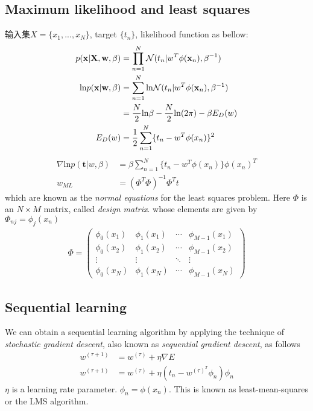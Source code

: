 \documentclass[a4paper]{article}
\begin{document}
\subsection{Maximum likelihood and least squares}
输入集$X = \{x_1,...,x_N\}$, target $\{t_n\}$, likelihood function as bellow:
\begin{align*}
  p(\mathbf{x}|\mathbf{X},\mathbf{w},\beta) &= \prod_{n=1}^N \mathcal{N}(t_n|w^T\phi(\mathbf{x}_n), \beta^{-1})\\
\mathrm{ln} p(\mathbf{x}|\mathbf{w},\beta) &= \sum_{n=1}^N \mathrm{ln} \mathcal{N}(t_n|w^T\phi(\mathbf{x}_n), \beta^{-1}) \\
& = {N \over 2} \mathrm{ln} \beta - {N \over 2} \mathrm{ln} (2\pi) - \beta E_D(w)\\
E_D(w) &= {1 \over 2} \sum_{n=1}^N \{t_n -w^T\phi(x_n)\}^2\\
\end{align*}
\begin{align*}
\nabla \mathrm{ln} p(\mathbf{t}|w,\beta) &= \beta \sum_{n=1}^N \{t_n -w^T\phi(x_n)\} \phi(x_n)^T\\
w_{ML} &= (\Phi^T\Phi)^{-1}\Phi^Tt
\end{align*}
which are known as the \textit{normal equations} for the least squares problem. Here $\Phi$ is an $N \times M$ matrix, called \textit{design matrix}. whose elements are given by $\Phi_{nj} = \phi_j(x_n)$
\begin{align}
  \Phi =
  \begin{pmatrix}
    \phi_0(x_1) & \phi_1(x_1) & \cdots & \phi_{M-1}(x_1)\\
    \phi_0(x_2) & \phi_1(x_2) & \cdots & \phi_{M-1}(x_2)\\
    \vdots & \vdots & \ddots & \vdots\\
    \phi_0(x_N) & \phi_1(x_N) & \cdots & \phi_{M-1}(x_N)
  \end{pmatrix}
\end{align}

\subsection{Sequential learning}
\label{sec:3.1.3}

We can obtain a sequential learning algorithm by applying the technique of \textit{stochastic gradient descent}, also known as \textit{sequential gradient descent}, as follows
\begin{align*}
  w^{(\tau+1)} &= w^{(\tau)} + \eta \nabla E\\
  w^{(\tau+1)} &= w^{(\tau)} + \eta (t_n - w^{(\tau)}^T\phi_n) \phi_n
\end{align*}
$\eta$ is a learning rate parameter. $\phi_n = \phi(x_n)$. This is known as least-mean-squares or the LMS algorithm.
\end{document}
